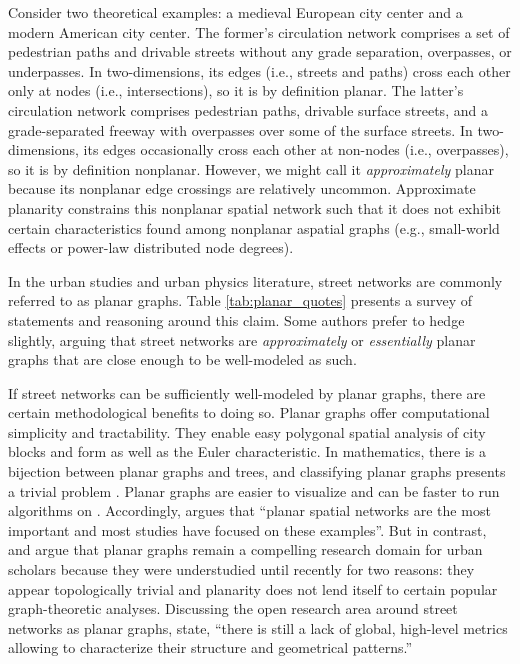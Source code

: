 \documentclass[Afour,sageh,times]{sagej}
\begin{document}
Consider two theoretical examples: a medieval European city center and a modern American city center. The former's circulation network comprises a set of pedestrian paths and drivable streets without any grade separation, overpasses, or underpasses. In two-dimensions, its edges (i.e., streets and paths) cross each other only at nodes (i.e., intersections), so it is by definition planar. The latter's circulation network comprises pedestrian paths, drivable surface streets, and a grade-separated freeway with overpasses over some of the surface streets. In two-dimensions, its edges occasionally cross each other at non-nodes (i.e., overpasses), so it is by definition nonplanar. However, we might call it \emph{approximately} planar because its nonplanar edge crossings are relatively uncommon. Approximate planarity constrains this nonplanar spatial network such that it does not exhibit certain characteristics found among nonplanar aspatial graphs (e.g., small-world effects or power-law distributed node degrees).

In the urban studies and urban physics literature, street networks are commonly referred to as planar graphs. Table \ref{tab:planar_quotes} presents a survey of statements and reasoning around this claim. Some authors prefer to hedge slightly, arguing that street networks are \emph{approximately} or \emph{essentially} planar graphs that are close enough to be well-modeled as such.

If street networks can be sufficiently well-modeled by planar graphs, there are certain methodological benefits to doing so. Planar graphs offer computational simplicity and tractability. They enable easy polygonal spatial analysis of city blocks and form \citep{fohl_non-planar_1996} as well as the Euler characteristic. In mathematics, there is a bijection between planar graphs and trees, and classifying planar graphs presents a trivial problem \citep{louf_typology_2014}. Planar graphs are easier to visualize and can be faster to run algorithms on \citep{liebers_planarizing_2001}. Accordingly, \citet[p.~3]{barthelemy_spatial_2011} argues that \enquote{planar spatial networks are the most important and most studies have focused on these examples}. But in contrast, \citet{masucci_random_2009} and \citet{masucci_limited_2013} argue that planar graphs remain a compelling research domain for urban scholars because they were understudied until recently for two reasons: they appear topologically trivial and planarity does not lend itself to certain popular graph-theoretic analyses. Discussing the open research area around street networks as planar graphs, \citet[p.~1]{viana_simplicity_2013} state, \enquote{there is still a lack of global, high-level metrics allowing to characterize their structure and geometrical patterns.}
\end{document}

